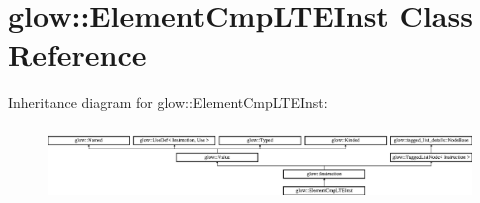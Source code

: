 \hypertarget{classglow_1_1_element_cmp_l_t_e_inst}{}\section{glow\+:\+:Element\+Cmp\+L\+T\+E\+Inst Class Reference}
\label{classglow_1_1_element_cmp_l_t_e_inst}
Inheritance diagram for glow\+:\+:Element\+Cmp\+L\+T\+E\+Inst\+:\begin{figure}[H]
\begin{center}
\leavevmode
\includegraphics[height=1.991111cm]{classglow_1_1_element_cmp_l_t_e_inst}
\end{center}
\end{figure}
